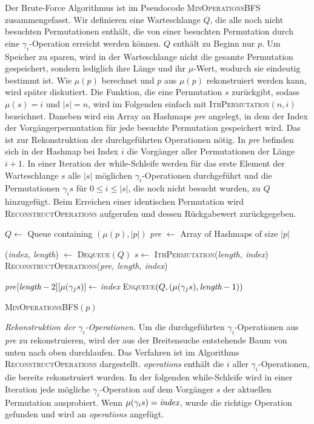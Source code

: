 \documentclass[a4paper, 10pt, ngerman]{article}
\begin{document}
Der Brute-Force Algorithmus ist im Pseudocode \textsc{MinOperationsBFS} zusammengefasst. Wir definieren eine Warteschlange $Q$, die alle noch nicht besuchten Permutationen enthält, die von einer besuchten Permutation durch eine $\gamma_i$-Operation erreicht werden können. $Q$ enthält zu Beginn nur $p$. Um Speicher zu sparen, wird in der Warteschlange nicht die gesamte Permutation gespeichert, sondern lediglich ihre Länge und ihr $\mu$-Wert, wodurch sie eindeutig bestimmt ist. Wie $\mu(p)$ berechnet und $p$ aus $\mu(p)$ rekonstruiert werden kann, wird später diskutiert. Die Funktion, die eine Permutation $s$ zurückgibt, sodass $\mu(s) = i$ und $|s| = n$, wird im Folgenden einfach mit \textsc{IthPermutation}$(n, i)$ bezeichnet.  Daneben wird ein Array an Hashmaps \emph{pre} angelegt, in dem der Index der Vorgängerpermutation für jede besuchte Permutation gespeichert wird. Das ist zur Rekonstruktion der durchgeführten Operationen nötig. In \emph{pre} befinden sich in der Hashmap bei Index $i$ die Vorgänger aller Permutationen der Länge $i + 1$. In einer Iteration der while-Schleife werden für das erste Element der Warteschlange $s$ alle $|s|$ möglichen $\gamma_i$-Operationen durchgeführt und die Permutationen $\gamma_i s$ für $0 \le i \le |s|$, die noch nicht besucht wurden, zu $Q$ hinzugefügt. Beim Erreichen einer identischen Permutation wird \textsc{ReconstructOperations} aufgerufen und dessen Rückgabewert zurückgegeben.

\begin{algorithm}
    $Q \gets$ Queue containing $(\mu(p), |p|)$ \;
    \emph{pre} $\gets$ Array of Hashmaps of size $|p|$ \;

    {
        (\emph{index, length}) $\gets$ \textsc{Dequeue}$(Q)$ \;
        $s \gets$ \textsc{IthPermutation}(\emph{length, index}) \;
        {
            \Return{} \textsc{ReconstructOperations}(\emph{pre, length, index}) \;
        }

        {
            {
                \emph{pre}$[\emph{length} - 2][\mu(\gamma_j s)] \gets$ \emph{index} \;
                \textsc{Enqueue}$(Q, (\mu(\gamma_j s), \emph{length} - 1))$ \;
            }
        }
    }

    \caption{\textsc{MinOperationsBFS}$(p)$}
\end{algorithm}

\medskip
\emph{{Rekonstruktion der $\gamma_i$-Operationen.}} Um die durchgeführten $\gamma_i$-Operationen aus \emph{pre} zu rekonstruieren, wird der aus der Breitensuche entstehende Baum von unten nach oben durchlaufen. Das Verfahren ist im Algorithms \textsc{ReconstructOperations} dargestellt. \emph{operations} enthält die $i$ aller $\gamma_i$-Operationen, die bereits rekonstruiert wurden. In der folgenden while-Schleife wird in einer Iteration jede mögliche $\gamma_i$-Operation auf dem Vorgänger $s$ der aktuellen Permutation ausprobiert. Wenn $\mu(\gamma_i s) = \emph{index}$, wurde die richtige Operation gefunden und wird an \emph{operations} angefügt. 
\end{document}
